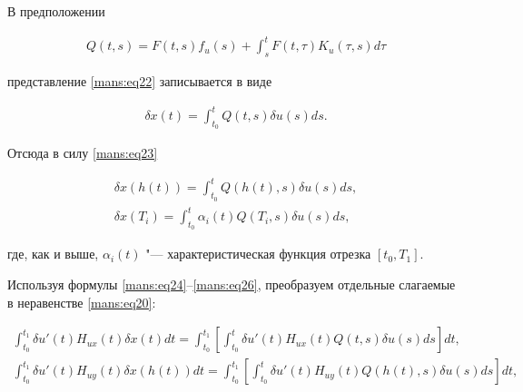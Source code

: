 В предположении

\begin{gather*}

Q(t, s)=F(t, s) f_{u}(s) +\int_{s}^{t}  F(t, \tau) K_{u}(\tau, s) d\tau 

\end{gather*}

представление \eqref{mans:eq22} записывается в виде

\begin{gather}

\delta x(t)=\int_{t_{0}}^{t}  Q(t, s) \delta u(s) ds .

\label{mans:eq24}

\end{gather}









Отсюда в силу \eqref{mans:eq23}

\begin{gather}

\label{mans:eq26}

\delta x(h(t))=\int_{t_{0}}^{t}  Q(h(t), s) \delta u(s) ds ,

\\

\label{mans:eq26}

\delta x(T_{i})=\int_{t_{0}}^{t} \alpha_{i}(t) Q(T_{i}, s) \delta u(s) ds ,

\end{gather}

где, как и выше, $ \alpha_{i}(t) $  "--- характеристическая функция отрезка  $ [t_{0}, T_{1}] $.





Используя формулы \eqref{mans:eq24}--\eqref{mans:eq26}, преобразуем отдельные слагаемые в неравенстве \eqref{mans:eq20}:

\begin{gather}

\label{mans:eq27}

\int_{t_{0}}^{t_{1}} \delta u'(t) H_{ux}(t) \delta x(t) dt=

\int_{t_{0}}^{t_{1}} \left[ \int_{t_{0}}^{t} \delta u'(t) H_{ux}(t) Q(t, s) \delta u(s) ds \right] dt ,

\\

\label{mans:eq30}

\int_{t_{0}}^{t_{1}} \delta u'(t) H_{uy}(t) \delta x(h(t)) dt=

\int_{t_{0}}^{t_{1}} \left[ \int_{t_{0}}^{t} \delta u'(t) H_{uy}(t) Q(h(t), s) \delta u(s) ds \right] dt ,

\end{gather}

